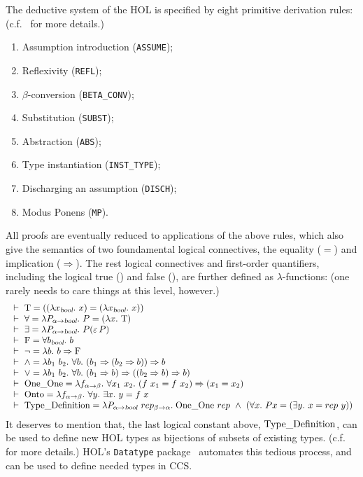 The deductive system of the HOL is specified by eight primitive
derivation rules: (c.f.~\cite{hollogic} for more details.)
\begin{enumerate}
\item Assumption introduction (\texttt{ASSUME});
\item Reflexivity (\texttt{REFL});
\item $\beta$-conversion (\texttt{BETA\_CONV});
\item Substitution (\texttt{SUBST});
\item Abstraction (\texttt{ABS});
\item Type instantiation (\texttt{INST\_TYPE});
\item Discharging an assumption (\texttt{DISCH});
\item Modus Ponens (\texttt{MP}).
\end{enumerate}
All proofs are eventually reduced to applications of the above rules,
which also give the semantics of two foundamental
logical connectives, the equality ($=$) and implication
($\Rightarrow$). The rest logical connectives and first-order
quantifiers, including the logical true () and false (), are
further defined as $\lambda$-functions: (one rarely needs to care
things at this level, however.)
\begin{equation*}
\begin{array}{l}
\ \vdash\  \mathrm{T}       =  ((\lambda x_{\textsl{bool}}.\ x) =
               (\lambda x_{\textsl{bool}}.\ x))    \\
\ \vdash\  \forall  =  \lambda P_{\alpha{\to}\textsl{bool}}.\  P =
                    (\lambda x.\ \mathrm{T} ) \\
\ \vdash\  \exists  =  \lambda P_{\alpha{\to}\textsl{bool}}.\  P({\varepsilon}\, P) \\
\ \vdash\  \mathrm{F}  =  \forall b_{\textsl{bool}}.\  b  \\
\ \vdash\  \neg    =  \lambda b.\  b \Rightarrow \mathrm{F} \\
\ \vdash\  {\wedge}  =  \lambda b_1\ b_2.\ \forall b.\  (b_1\Rightarrow (b_2 \Rightarrow b)) \Rightarrow b \\
\ \vdash\  {\vee}  =  \lambda b_1\ b_2.\ \forall b.\  (b_1 \Rightarrow b)\Rightarrow ((b_2 \Rightarrow b) \Rightarrow b) \\
\ \vdash\  \mathrm{One\_One}  =  \lambda f_{\alpha {\to}\beta}.\ \forall x_1\ x_2.\ 
                    (f\ x_1 = f\ x_2)  \Rightarrow (x_1 = x_2) \\
\ \vdash\  \mathrm{Onto}  =  \lambda f_{\alpha{\to}\beta}.\ 
                  \forall y.\ \exists x.\  y = f\ x \\
\ \vdash\  \mathrm{Type\_Definition}  =  \lambda P_{\alpha{\to}\textsl{bool}}\
                  rep_{\beta{\to}\alpha}.\;
                  \mathrm{One\_One}\ rep \ \wedge{}\  (\forall x.\ P x = (\exists y.\  x = rep\ y))
\end{array}
\end{equation*}
It deserves to mention that, the last logical constant above,
$\mathrm{Type\_Definition}$, can be used to define new HOL types as bijections of
subsets of existing types. (c.f.~\cite{Melham:1989dk} for more details.)
HOL's \texttt{Datatype} package~\cite{Melham:1991, holdesc} automates
this tedious process, and can be used to define needed types in CCS.

